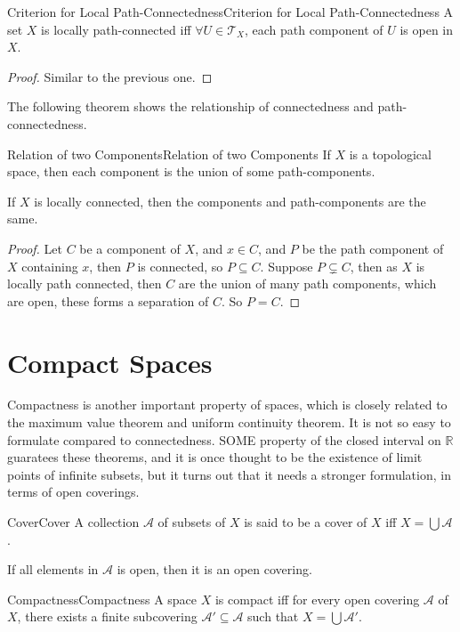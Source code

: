 \documentclass[../main.tex]{subfiles}
\begin{document}
\begin{theorem}{Criterion for Local Path-Connectedness}{Criterion for Local Path-Connectedness}
A set $X$ is locally path-connected iff $\forall U\in \mathcal{T}_X$, each path component of $U$ is open in $X$.
\end{theorem}
\begin{proof}
Similar to the previous one.
\end{proof}

The following theorem shows the relationship of connectedness and path-connectedness.

\begin{theorem}{Relation of two Components}{Relation of two Components}
If $X$ is a topological space, then each component is the union of some path-components.

If $X$ is locally connected, then the components and path-components are the same.
\end{theorem}
\begin{proof}
Let $C$ be a component of $X$, and $x\in C$, and $P$ be the path component of $X$ containing $x$, then $P$ is connected, so $P \subseteq C$. Suppose $P \subsetneq C $, then as $X$ is locally path connected, then $C$ are the union of many path components, which are open, these forms a separation of $C$. So $P = C$.
\end{proof}

\section{Compact Spaces}

Compactness is another important property of spaces, which is closely related to the maximum value theorem and uniform continuity theorem. It is not so easy to formulate compared to connectedness. SOME property of the closed interval on $\mathbb{R}$ guaratees these theorems, and it is once thought to be the existence of limit points of infinite subsets, but it turns out that it needs a stronger formulation, in terms of open coverings.

\begin{definition}{Cover}{Cover}
A collection $\mathcal{A}$ of subsets of $X$ is said to be a cover of $X$ iff $X = \bigcup \mathcal{A} $.

If all elements in $\mathcal{A}$ is open, then it is an open covering.
\end{definition}

\begin{definition}{Compactness}{Compactness}
	A space $X$ is compact iff for every open covering $\mathcal{A}$ of $X$, there exists a finite subcovering $\mathcal{A}' \subseteq \mathcal{A}$ such that $X = \bigcup \mathcal{A}'$.
\end{definition}
\end{document}
